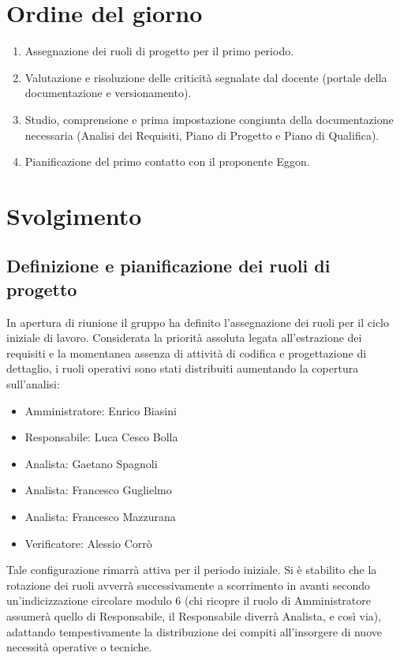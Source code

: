 \documentclass[interno]{gpt}
\begin{document}
\section{Ordine del giorno}
\begin{enumerate}
  \item Assegnazione dei ruoli di progetto per il primo periodo.
  \item Valutazione e risoluzione delle criticità segnalate dal docente (portale della documentazione e versionamento).
  \item Studio, comprensione e prima impostazione congiunta della documentazione necessaria (Analisi dei Requisiti, Piano di Progetto e Piano di Qualifica).
  \item Pianificazione del primo contatto con il proponente Eggon.
\end{enumerate}

\clearpage

\section{Svolgimento}
\subsection{Definizione e pianificazione dei ruoli di progetto}
In apertura di riunione il gruppo ha definito l'assegnazione dei ruoli per il ciclo iniziale di lavoro. Considerata la priorità assoluta legata all'estrazione dei requisiti e la momentanea assenza di attività di codifica e progettazione di dettaglio, i ruoli operativi sono stati distribuiti aumentando la copertura sull'analisi:
\begin{itemize}
  \item Amministratore: Enrico Biasini
  \item Responsabile: Luca Cesco Bolla
  \item Analista: Gaetano Spagnoli
  \item Analista: Francesco Guglielmo
  \item Analista: Francesco Mazzurana
  \item Verificatore: Alessio Corrò
\end{itemize}
Tale configurazione rimarrà attiva per il periodo iniziale. Si è stabilito che la rotazione dei ruoli avverrà successivamente a scorrimento in avanti secondo un'indicizzazione circolare modulo 6 (chi ricopre il ruolo di Amministratore assumerà quello di Responsabile, il Responsabile diverrà Analista, e così via), adattando tempestivamente la distribuzione dei compiti all'insorgere di nuove necessità operative o tecniche.
\end{document}
